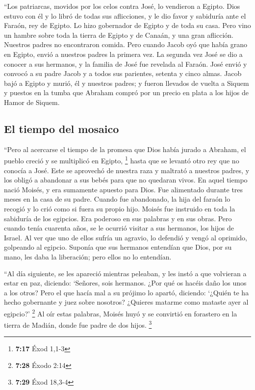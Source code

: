  ``Los patriarcas, movidos por los celos contra José, lo
vendieron a Egipto. Dios estuvo con él  y lo libró de
todas sus aflicciones, y le dio favor y sabiduría ante el Faraón, rey de
Egipto. Lo hizo gobernador de Egipto y de toda su casa. 
Pero vino un hambre sobre toda la tierra de Egipto y de Canaán, y una
gran aflicción. Nuestros padres no encontraron comida. 
Pero cuando Jacob oyó que había grano en Egipto, envió a nuestros padres
la primera vez.  La segunda vez José se dio a conocer a
sus hermanos, y la familia de José fue revelada al Faraón.
 José envió y convocó a su padre Jacob y a todos sus
parientes, setenta y cinco almas.  Jacob bajó a Egipto y
murió, él y nuestros padres;  y fueron llevados de vuelta
a Siquem y puestos en la tumba que Abraham compró por un precio en plata
a los hijos de Hamor de Siquem.

\hypertarget{el-tiempo-del-mosaico}{%
\subsection{El tiempo del mosaico}\label{el-tiempo-del-mosaico}}

 ``Pero al acercarse el tiempo de la promesa que Dios
había jurado a Abraham, el pueblo creció y se multiplicó en Egipto,
\footnote{\textbf{7:17} Éxod 1,1-3}  hasta que se levantó
otro rey que no conocía a José.  Este se aprovechó de
nuestra raza y maltrató a nuestros padres, y los obligó a abandonar a
sus bebés para que no quedaran vivos.  En aquel tiempo
nació Moisés, y era sumamente apuesto para Dios. Fue alimentado durante
tres meses en la casa de su padre.  Cuando fue
abandonado, la hija del faraón lo recogió y lo crió como si fuera su
propio hijo.  Moisés fue instruido en toda la sabiduría
de los egipcios. Era poderoso en sus palabras y en sus obras.
 Pero cuando tenía cuarenta años, se le ocurrió visitar a
sus hermanos, los hijos de Israel.  Al ver que uno de
ellos sufría un agravio, lo defendió y vengó al oprimido, golpeando al
egipcio.  Suponía que sus hermanos entendían que Dios,
por su mano, les daba la liberación; pero ellos no lo entendían.

 ``Al día siguiente, se les apareció mientras peleaban, y
les instó a que volvieran a estar en paz, diciendo: `Señores, sois
hermanos. ¿Por qué os hacéis daño los unos a los otros? 
Pero el que hacía mal a su prójimo lo apartó, diciendo: `¿Quién te ha
hecho gobernante y juez sobre nosotros?  ¿Quieres matarme
como mataste ayer al egipcio?' \footnote{\textbf{7:28} Éxodo 2:14}
 Al oír estas palabras, Moisés huyó y se convirtió en
forastero en la tierra de Madián, donde fue padre de dos hijos.
\footnote{\textbf{7:29} Éxod 18,3-4}

